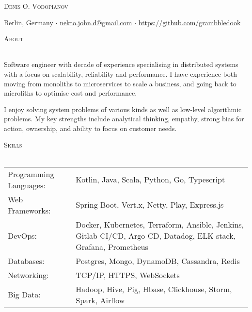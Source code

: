 \documentclass[a4paper]{article}
\makeatletter
\newcommand{\lineunder} {
    \vspace*{-8pt} \\
    \hspace*{-18pt} \hrulefill \\
}
\newcommand{\header} [1] {
        {\hspace*{-18pt}\vspace*{6pt} \textsc{#1}}
    \vspace*{-6pt} \lineunder
}
\def\email{nekto.john.d@gmail.com}
\def\phone{555-55-55}
\makeatother
\begin{document}
    \vspace*{-40pt}


    \vspace*{-10pt}
    \begin{center}
        \Huge \scshape {Denis O. Vodopianov} \\ \vspace{1mm}
    \end{center}

    \begin{center}
        Berlin, Germany $\cdot$
        \href{mailto:\email}{\email} $\cdot$
        \url{https://github.com/grambbledook}\\
    \end{center}

    \header{About}
    \begin{raggedright}
        Software engineer with decade of experience specialising in distributed systems with a focus on scalability, reliability and performance.
        I have experience both moving from monoliths to microservices to scale a business, and going back to microliths
        to optimise cost and performance. \break

        I enjoy solving system problems of various kinds as well as low-level algorithmic problems.
        My key strengths include analytical thinking, empathy, strong bias for action, ownership, and ability to focus on customer needs. \\
    \end{raggedright}
    \vspace{2mm}

    \header{Skills}
    \begin{tabularx}{\textwidth}{p{5cm} X}
        Programming Languages: & Kotlin, Java, Scala, Python, Go, Typescript                                                                     \\
        Web Frameworks:        & Spring Boot, Vert.x, Netty, Play, Express.js                                                                    \\
        DevOps:                & Docker, Kubernetes, Terraform, Ansible, Jenkins, Gitlab CI/CD, Argo CD, Datadog, ELK stack, Grafana, Prometheus \\
        Databases:             & Postgres, Mongo, DynamoDB, Cassandra, Redis                                                                     \\
        Networking:            & TCP/IP, HTTPS, WebSockets                                                                                       \\
        Big Data:              & Hadoop, Hive, Pig, Hbase, Clickhouse, Storm, Spark, Airflow                                                     \\
    \end{tabularx}
    \vspace{2mm}
\end{document}
